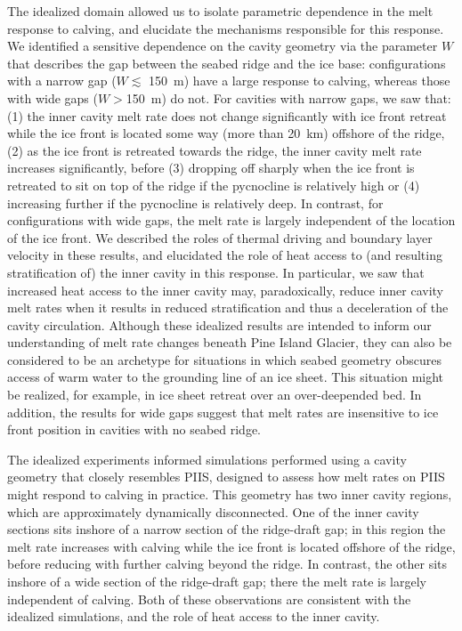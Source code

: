 \documentclass[draft]{agujournal2019}
\begin{document}
The idealized domain allowed us to isolate parametric dependence in the melt response to calving, and elucidate the mechanisms responsible for this response. We identified a sensitive dependence on the cavity geometry via the parameter $W$ that describes the gap between the seabed ridge and the ice base: configurations with a narrow gap ($W \lesssim$ 150~m) have a large response to calving, whereas those with wide gaps ($W>$150~m) do not. For cavities with narrow gaps, we saw that: (1) the inner cavity melt rate does not change significantly with ice front retreat while the ice front is located some way (more than 20~km) offshore of the ridge, (2) as the ice front is retreated towards the ridge, the inner cavity melt rate increases significantly, before (3) dropping off sharply when the ice front is retreated to sit on top of the ridge if the pycnocline is relatively high or (4) increasing further if the pycnocline is relatively deep. In contrast, for configurations with wide gaps, the melt rate is largely independent of the location of the ice front. We described the roles of thermal driving and boundary layer velocity in these results, and elucidated the role of heat access to (and resulting stratification of) the inner cavity in this response. In particular, we saw that increased heat access to the inner cavity may, paradoxically, reduce inner cavity melt rates when it results in reduced stratification and thus a deceleration of the cavity circulation. Although these idealized results are intended to inform our understanding of melt rate changes beneath Pine Island Glacier, they can also be considered to be an archetype for situations in which seabed geometry obscures access of warm water to the grounding line of an ice sheet. This situation might be realized, for example, in ice sheet retreat over an over-deepended bed. In addition, the results for wide gaps suggest that melt rates are insensitive to ice front position in cavities with no seabed ridge. 

The idealized experiments informed simulations performed using a cavity geometry that closely resembles PIIS, designed to assess how melt rates on PIIS might respond to calving in practice. This geometry has two inner cavity regions, which are approximately dynamically disconnected. One of the inner cavity sections sits inshore of a narrow section of the ridge-draft gap; in this region the melt rate increases with calving while the ice front is located offshore of the ridge, before reducing with further calving beyond the ridge. In contrast, the other sits inshore of a wide section of the ridge-draft gap; there the melt rate is largely independent of calving. Both of these observations are consistent with the idealized simulations, and the role of heat access to the inner cavity. %
\end{document}

